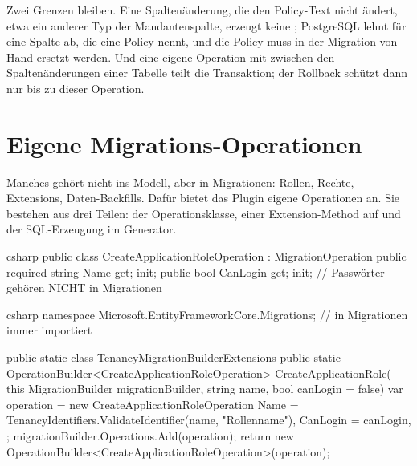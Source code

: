 Zwei Grenzen bleiben. Eine Spaltenänderung, die den Policy-Text nicht ändert, etwa ein anderer
Typ der Mandantenspalte, erzeugt keine ;
PostgreSQL lehnt  für eine Spalte ab, die eine Policy nennt, und
die Policy muss in der Migration von Hand ersetzt werden. Und eine eigene Operation mit
 zwischen den Spaltenänderungen einer Tabelle teilt
die Transaktion; der Rollback schützt dann nur bis zu dieser Operation.

\chapter{Eigene Migrations-Operationen}\label{ch:custom-migration-operations}

Manches gehört nicht ins Modell, aber in Migrationen: Rollen, Rechte, Extensions,
Daten-Backfills. Dafür bietet das Plugin eigene Operationen an. Sie bestehen aus drei
Teilen: der Operationsklasse, einer Extension-Method auf
 und der SQL-Erzeugung im Generator.

\begin{sourcecode}{csharp}
public class CreateApplicationRoleOperation : MigrationOperation
{
    public required string Name { get; init; }
    public bool CanLogin { get; init; }       // Passwörter gehören NICHT in Migrationen
}
\end{sourcecode}

\begin{sourcecode}{csharp}
namespace Microsoft.EntityFrameworkCore.Migrations;      // in Migrationen immer importiert

public static class TenancyMigrationBuilderExtensions
{
    public static OperationBuilder<CreateApplicationRoleOperation> CreateApplicationRole(
        this MigrationBuilder migrationBuilder, string name, bool canLogin = false)
    {
        var operation = new CreateApplicationRoleOperation
        {
            Name = TenancyIdentifiers.ValidateIdentifier(name, "Rollenname"),
            CanLogin = canLogin,
        };
        migrationBuilder.Operations.Add(operation);
        return new OperationBuilder<CreateApplicationRoleOperation>(operation);
    }
}
\end{sourcecode}

